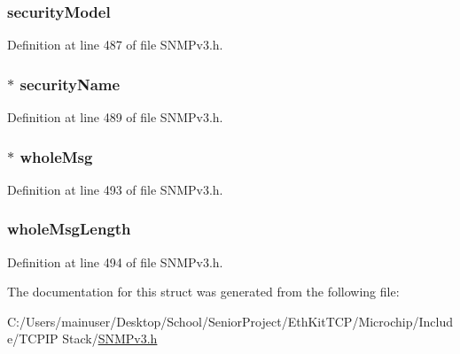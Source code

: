 \subsubsection[{security\+Model}]{ security\+Model}\label{struct_security_sys_generate_request_msg_ac19ed44216346e9d6c50819813db6867}


Definition at line 487 of file S\+N\+M\+Pv3.\+h.

\hypertarget{struct_security_sys_generate_request_msg_a4a48a8746988a1f761c3e9eadcc20463}{}
\subsubsection[{security\+Name}]{$\ast$ security\+Name}\label{struct_security_sys_generate_request_msg_a4a48a8746988a1f761c3e9eadcc20463}


Definition at line 489 of file S\+N\+M\+Pv3.\+h.

\hypertarget{struct_security_sys_generate_request_msg_a004e34c44705bf128556c60cca7a6586}{}
\subsubsection[{whole\+Msg}]{$\ast$ whole\+Msg}\label{struct_security_sys_generate_request_msg_a004e34c44705bf128556c60cca7a6586}


Definition at line 493 of file S\+N\+M\+Pv3.\+h.

\hypertarget{struct_security_sys_generate_request_msg_ae69530a979f1b7b71b437d128ffc63ff}{}
\subsubsection[{whole\+Msg\+Length}]{ whole\+Msg\+Length}\label{struct_security_sys_generate_request_msg_ae69530a979f1b7b71b437d128ffc63ff}


Definition at line 494 of file S\+N\+M\+Pv3.\+h.



The documentation for this struct was generated from the following file\+:\begin{DoxyCompactItemize}
\item 
C\+:/\+Users/mainuser/\+Desktop/\+School/\+Senior\+Project/\+Eth\+Kit\+T\+C\+P/\+Microchip/\+Include/\+T\+C\+P\+I\+P Stack/\hyperlink{_s_n_m_pv3_8h}{S\+N\+M\+Pv3.\+h}\end{DoxyCompactItemize}
